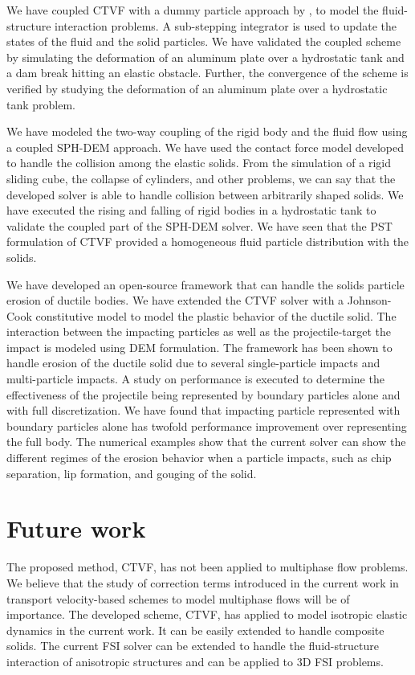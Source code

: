We have coupled CTVF with a dummy particle approach by \cite{Adami2012}, to
model the fluid-structure interaction problems. A sub-stepping integrator is
used to update the states of the fluid and the solid particles. We have
validated the coupled scheme by simulating the deformation of an aluminum plate
over a hydrostatic tank and a dam break hitting an elastic obstacle. Further,
the convergence of the scheme is verified by studying the deformation of an
aluminum plate over a hydrostatic tank problem.

We have modeled the two-way coupling of the rigid body and the fluid flow using
a coupled SPH-DEM approach. We have used the contact force model developed to
handle the collision among the elastic solids. From the simulation of a rigid
sliding cube, the collapse of cylinders, and other problems, we can say that the
developed solver is able to handle collision between arbitrarily shaped solids.
We have executed the rising and falling of rigid bodies in a hydrostatic tank to
validate the coupled part of the SPH-DEM solver. We have seen that the PST
formulation of CTVF provided a homogeneous fluid particle distribution with the
solids.


We have developed an open-source framework that can handle the solids particle
erosion of ductile bodies. We have extended the CTVF solver with a Johnson-Cook
constitutive model to model the plastic behavior of the ductile solid. The
interaction between the impacting particles as well as the projectile-target the
impact is modeled using DEM formulation. The framework has been shown to handle
erosion of the ductile solid due to several single-particle impacts and
multi-particle impacts. A study on performance is executed to determine the
effectiveness of the projectile being represented by boundary particles alone
and with full discretization. We have found that impacting particle represented
with boundary particles alone has twofold performance improvement over
representing the full body. The numerical examples show that the current solver
can show the different regimes of the erosion behavior when a particle impacts,
such as chip separation, lip formation, and gouging of the solid.



\section{Future work}\label{conclusions:future_work}
The proposed method, CTVF, has not been applied to multiphase flow problems. We
believe that the study of correction terms introduced in the current work in
transport velocity-based schemes to model multiphase flows will be of
importance. The developed scheme, CTVF, has applied to model isotropic elastic
dynamics in the current work. It can be easily extended to handle composite
solids. The current FSI solver can be extended to handle the fluid-structure
interaction of anisotropic structures and can be applied to 3D FSI problems.


